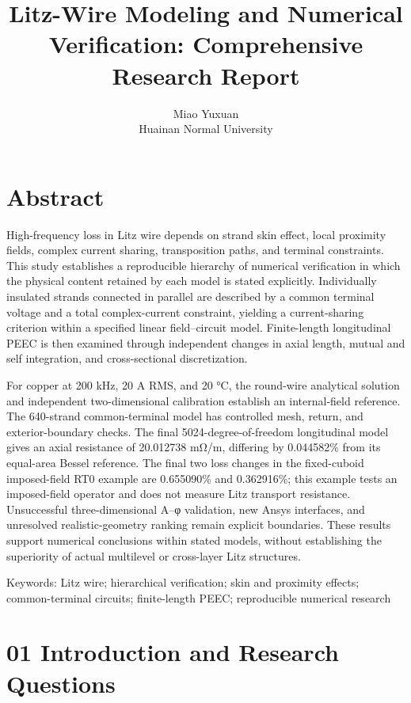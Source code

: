 \documentclass[11pt]{article}
\begin{document}
\title{Litz-Wire Modeling and Numerical Verification: Comprehensive Research Report}
\author{Miao Yuxuan\\Huainan Normal University}
\date{}
\maketitle
\FloatBarrier
\section*{Abstract}
\hypertarget{abstract}{}
High-frequency loss in Litz wire depends on strand skin effect, local proximity fields, complex current sharing, transposition paths, and terminal constraints. This study establishes a reproducible hierarchy of numerical verification in which the physical content retained by each model is stated explicitly. Individually insulated strands connected in parallel are described by a common terminal voltage and a total complex-current constraint, yielding a current-sharing criterion within a specified linear field–circuit model. Finite-length longitudinal PEEC is then examined through independent changes in axial length, mutual and self integration, and cross-sectional discretization.

For copper at 200 kHz, 20 A RMS, and 20 °C, the round-wire analytical solution and independent two-dimensional calibration establish an internal-field reference. The 640-strand common-terminal model has controlled mesh, return, and exterior-boundary checks. The final 5024-degree-of-freedom longitudinal model gives an axial resistance of 20.012738 mΩ/m, differing by 0.044582\% from its equal-area Bessel reference. The final two loss changes in the fixed-cuboid imposed-field RT0 example are 0.655090\% and 0.362916\%; this example tests an imposed-field operator and does not measure Litz transport resistance. Unsuccessful three-dimensional A–φ validation, new Ansys interfaces, and unresolved realistic-geometry ranking remain explicit boundaries. These results support numerical conclusions within stated models, without establishing the superiority of actual multilevel or cross-layer Litz structures.


Keywords: Litz wire; hierarchical verification; skin and proximity effects; common-terminal circuits; finite-length PEEC; reproducible numerical research


\FloatBarrier
\section*{01 Introduction and Research Questions}
\hypertarget{chapter-01}{}
\end{document}
